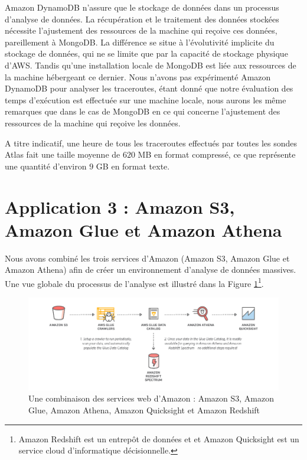  Amazon DynamoDB  n'assure que le stockage de données dans un processus d'analyse de données. La récupération et le traitement  des données stockées nécessite l'ajustement des ressources de la machine qui reçoive ces données, pareillement à MongoDB. La différence se situe à l'évolutivité implicite du stockage de données, qui ne se limite que par la capacité de stockage physique d'AWS. Tandis qu'une installation locale de MongoDB est liée aux ressources de la machine hébergeant ce dernier.  Nous n'avons pas expérimenté Amazon DynamoDB pour analyser les traceroutes, étant donné que notre évaluation des temps d'exécution est effectuée sur une machine locale, nous aurons les même remarques que dans le cas de MongoDB en ce qui concerne l'ajustement des ressources de la machine qui reçoive les données.  
 
 A titre indicatif, une heure de tous les traceroutes effectués par toutes les sondes Atlas fait une taille moyenne de  $620$ MB en format compressé, ce que représente une quantité d'environ $9$ GB en format texte.






\section{Application 3 : Amazon S3, Amazon Glue  et Amazon Athena }



Nous avons combiné les trois services d'Amazon (Amazon S3, Amazon Glue  et Amazon Athena)  afin de créer un environnement d'analyse de données massives. Une vue globale du  processus de l'analyse  est illustré dans la Figure \ref{fig:gluecrawler}\footnote{Amazon Redshift  est un entrepôt de données et et  Amazon Quicksight  est un service cloud d'informatique décisionnelle.}. 

\begin{figure}[H]
	\centering
	\captionsetup{justification=centering}
	\includegraphics[width=1\linewidth]{illustrations/glue_crawler}
	\caption{Une combinaison des services web d'Amazon : Amazon S3, Amazon Glue, Amazon Athena, Amazon Quicksight  et Amazon Redshift}
	\label{fig:gluecrawler}
\end{figure}


